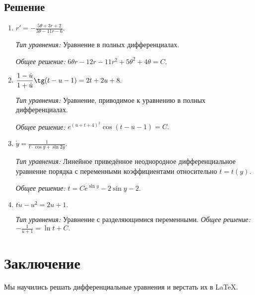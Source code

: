 \documentclass[14pt, a4paper, titlepage, fleqn]{extarticle}
\newcommand{\rnc}[1]
    {\MakeUppercase{\romannumeral #1}}
\begin{document}
        \subsection{Решение}
            \begin{enumerate}
                \item 
                \(
                    \displaystyle
                    r' = -\frac{5\theta + 3r + 2}{3\theta -11r-6}. 
                \)

                \textit{Тип уравнения:}
                Уравнение в полных дифференциалах.

                \textit{Общее решение:}
                \(
                    \displaystyle
                    6 \theta r-12r-11r^2+5\theta^2+4\theta=C.
                \)

                \item 
                \(
                    \displaystyle
                    \frac{1-\dot{u}}{1+\dot{u}} \tg (t-u-1) = 2t+2u+8.
                \)

                \textit{Тип уравнения:}
                Уравнение, приводимое к уравнению в полных дифференциалах.

                \textit{Общее решение:}
                \(
                    \displaystyle
                    e^{(u+t+4)^2} \cos(t-u-1) = C.
                \)

                \pagebreak
                \item 
                \(
                    \displaystyle
                    \dot{y} = \frac{1}{t \cdot \cos{y} + \sin{2y}}.
                \)

                \textit{Тип уравнения:}
                Линейное приведённое неоднородное дифференциальное уравнение 
                \rnc{1} порядка с переменными коэффициентами относительно
                \(t = t(y)\).

                \textit{Общее решение:}
                \(
                    \displaystyle
                    t = C e^{\sin{y}} - 2 \sin{y}-2.
                \)
                
                \item 
                \(
                    \displaystyle
                    t\dot{u} - u^2=2u+1.
                \)

                \textit{Тип уравнения:} Уравнение с разделяющимися переменными.
                \textit{Общее решение:}
                \(
                    \displaystyle
                    -\frac{1}{u+1}=\ln{t}+C.
                \)
            \end{enumerate}

    \pagebreak

    \section{Заключение}
        Мы научились решать дифференциальные 
        уравнения и верстать их в \LaTeX.
\end{document}

